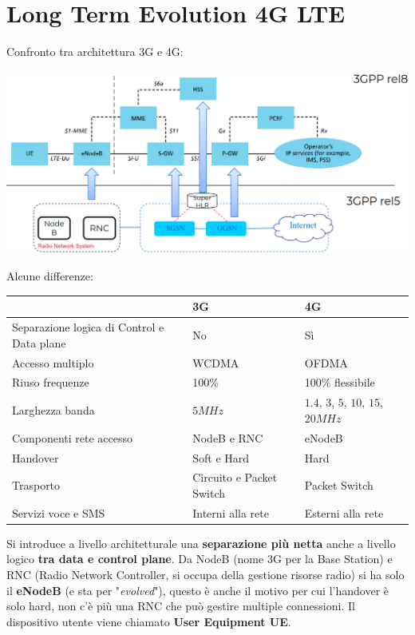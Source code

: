 \section{Long Term Evolution 4G LTE}

Confronto tra architettura 3G e 4G:
\begin{center}
	\includegraphics[width=0.95\linewidth]{img/4g/3g4g}
\end{center}

Alcune differenze: 
\begin{center}
	\begin{tabular}{| m{3.5cm} | m{2cm} | m{2cm} |}
		\hline
		& 3G & 4G \\
		\hline
		Separazione logica di Control e Data plane &  No & Sì \\
		\hline
		Accesso multiplo  &WCDMA & OFDMA \\
		\hline
		Riuso frequenze & 100\% & 100\% flessibile \\
		\hline
		Larghezza banda & $5 MHz$ & $1.4$, $3$, $5$, $10$, $15$, $20 MHz$ \\
		\hline		
		Componenti rete accesso & NodeB e RNC & eNodeB \\
		\hline
		Handover & Soft e Hard & Hard \\
		\hline
		Trasporto & Circuito e Packet Switch & Packet Switch \\
		\hline
		Servizi voce e SMS & Interni alla rete & Esterni alla rete \\
		\hline
	\end{tabular}
\end{center}

Si introduce a livello architetturale una \textbf{separazione più netta} anche a livello logico \textbf{tra data e control plane}. Da NodeB (nome 3G per la Base Station) e RNC (Radio Network Controller, si occupa della gestione risorse radio) si ha solo il \textbf{eNodeB} (e sta per "\textit{evolved}"), questo è anche il motivo per cui l'handover è solo hard, non c'è più una RNC che può gestire multiple connessioni. Il dispositivo utente viene chiamato \textbf{User Equipment UE}.\\

